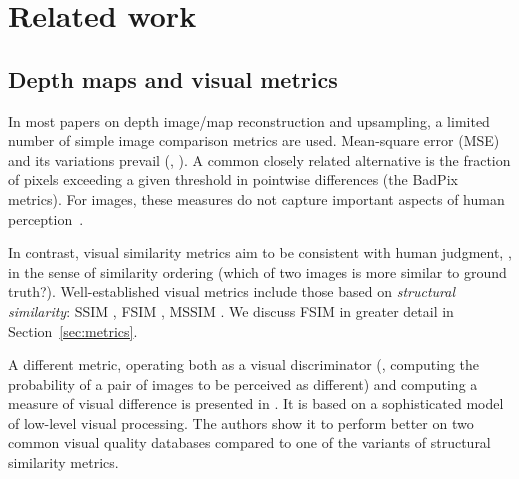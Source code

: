 \section{Related work}
\label{sec:related}

\subsection{Depth maps and visual metrics}

In most papers on depth image/map reconstruction and upsampling, a limited number of simple image comparison metrics are used.  Mean-square error (MSE) and its variations prevail (\eg, \cite{eigen2014depth,honauer2015hci, honauer2016dataset,honauer2016benchmark}). A common closely related alternative is the fraction of pixels exceeding a given threshold in pointwise differences (the BadPix metrics). For images, these measures do not capture important aspects of human perception~\cite{wang2009mean}.

In contrast, visual similarity metrics aim to be consistent with human judgment, \eg, in the sense of similarity ordering
(which of two images is more similar to ground truth?). 
Well-established visual metrics include those based on \emph{structural similarity}:  SSIM \cite{wang2004image},
FSIM \cite{zhang2011fsim}, MSSIM \cite{wang2003multiscale}. 
We discuss FSIM in greater detail in Section~\ref{sec:metrics}.

A different metric, operating both as a visual discriminator (\ie, computing the probability
of a pair of images to be perceived as different) and computing a measure of visual difference is
presented in \cite{mantiuk2011hdr}.  It is based on a sophisticated model of low-level visual processing.
The authors show it to perform better on two common visual quality databases compared to one
of the variants of structural similarity metrics. 

